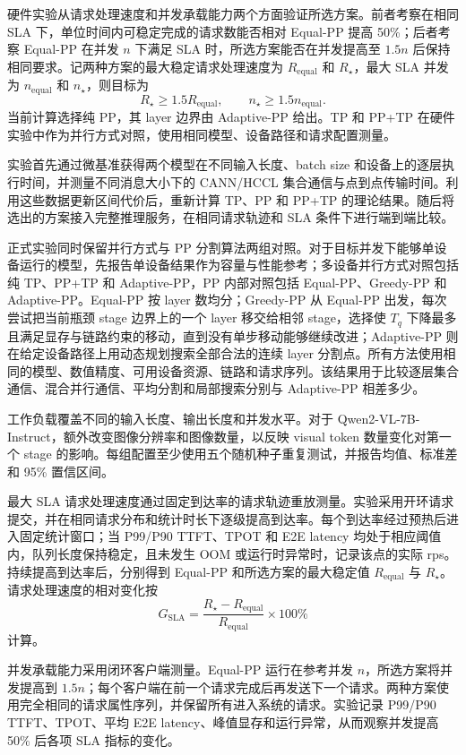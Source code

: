硬件实验从请求处理速度和并发承载能力两个方面验证所选方案。前者考察在相同 SLA 下，单位时间内可稳定完成的请求数能否相对 Equal-PP 提高 50\%；后者考察 Equal-PP 在并发 \(n\) 下满足 SLA 时，所选方案能否在并发提高至 \(1.5n\) 后保持相同要求。记两种方案的最大稳定请求处理速度为 \(R_{\mathrm{equal}}\) 和 \(R_{\star}\)，最大 SLA 并发为 \(n_{\mathrm{equal}}\) 和 \(n_{\star}\)，则目标为
\[
R_{\star}\geq1.5R_{\mathrm{equal}},
\qquad
n_{\star}\geq1.5n_{\mathrm{equal}}.
\]
当前计算选择纯 PP，其 layer 边界由 Adaptive-PP 给出。TP 和 PP+TP 在硬件实验中作为并行方式对照，使用相同模型、设备路径和请求配置测量。

实验首先通过微基准获得两个模型在不同输入长度、batch size 和设备上的逐层执行时间，并测量不同消息大小下的 CANN/HCCL 集合通信与点到点传输时间。利用这些数据更新区间代价后，重新计算 TP、PP 和 PP+TP 的理论结果。随后将选出的方案接入完整推理服务，在相同请求轨迹和 SLA 条件下进行端到端比较。

正式实验同时保留并行方式与 PP 分割算法两组对照。对于目标并发下能够单设备运行的模型，先报告单设备结果作为容量与性能参考；多设备并行方式对照包括纯 TP、PP+TP 和 Adaptive-PP，PP 内部对照包括 Equal-PP、Greedy-PP 和 Adaptive-PP。Equal-PP 按 layer 数均分；Greedy-PP 从 Equal-PP 出发，每次尝试把当前瓶颈 stage 边界上的一个 layer 移交给相邻 stage，选择使 \(T_q\) 下降最多且满足显存与链路约束的移动，直到没有单步移动能够继续改进；Adaptive-PP 则在给定设备路径上用动态规划搜索全部合法的连续 layer 分割点。所有方法使用相同的模型、数值精度、可用设备资源、链路和请求序列。该结果用于比较逐层集合通信、混合并行通信、平均分割和局部搜索分别与 Adaptive-PP 相差多少。

工作负载覆盖不同的输入长度、输出长度和并发水平。对于 Qwen2-VL-7B-Instruct，额外改变图像分辨率和图像数量，以反映 visual token 数量变化对第一个 stage 的影响。每组配置至少使用五个随机种子重复测试，并报告均值、标准差和 95\% 置信区间。

最大 SLA 请求处理速度通过固定到达率的请求轨迹重放测量。实验采用开环请求提交，并在相同请求分布和统计时长下逐级提高到达率。每个到达率经过预热后进入固定统计窗口；当 P99/P90 TTFT、TPOT 和 E2E latency 均处于相应阈值内，队列长度保持稳定，且未发生 OOM 或运行时异常时，记录该点的实际 rps。持续提高到达率后，分别得到 Equal-PP 和所选方案的最大稳定值 \(R_{\mathrm{equal}}\) 与 \(R_{\star}\)。请求处理速度的相对变化按
\[
G_{\mathrm{SLA}}=\frac{R_{\star}-R_{\mathrm{equal}}}
{R_{\mathrm{equal}}}\times100\%
\]
计算。

并发承载能力采用闭环客户端测量。Equal-PP 运行在参考并发 \(n\)，所选方案将并发提高到 \(1.5n\)；每个客户端在前一个请求完成后再发送下一个请求。两种方案使用完全相同的请求属性序列，并保留所有进入系统的请求。实验记录 P99/P90 TTFT、TPOT、平均 E2E latency、峰值显存和运行异常，从而观察并发提高 50\% 后各项 SLA 指标的变化。

